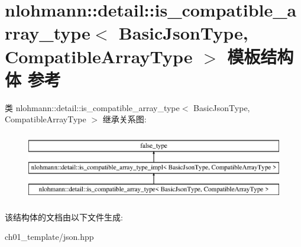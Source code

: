 \hypertarget{structnlohmann_1_1detail_1_1is__compatible__array__type}{}\section{nlohmann\+::detail\+::is\+\_\+compatible\+\_\+array\+\_\+type$<$ Basic\+Json\+Type, Compatible\+Array\+Type $>$ 模板结构体 参考}
\label{structnlohmann_1_1detail_1_1is__compatible__array__type}
类 nlohmann\+::detail\+::is\+\_\+compatible\+\_\+array\+\_\+type$<$ Basic\+Json\+Type, Compatible\+Array\+Type $>$ 继承关系图\+:\begin{figure}[H]
\begin{center}
\leavevmode
\includegraphics[height=3.000000cm]{structnlohmann_1_1detail_1_1is__compatible__array__type}
\end{center}
\end{figure}


该结构体的文档由以下文件生成\+:\begin{DoxyCompactItemize}
\item 
ch01\+\_\+template/json.\+hpp\end{DoxyCompactItemize}
